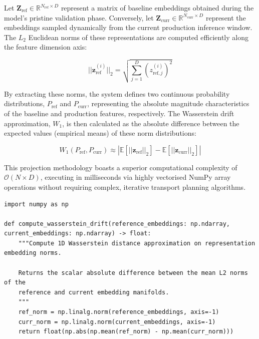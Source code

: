 Let $\mathbf{Z}_{\text{ref}} \in \mathbb{R}^{N_{\text{ref}} \times D}$ represent a matrix of baseline embeddings obtained during the model's pristine validation phase. Conversely, let $\mathbf{Z}_{\text{curr}} \in \mathbb{R}^{N_{\text{curr}} \times D}$ represent the embeddings sampled dynamically from the current production inference window. The $L_2$ Euclidean norms of these representations are computed efficiently along the feature dimension axis:

\begin{equation}
    ||\mathbf{z}_{\text{ref}}^{(i)}||_2 = \sqrt{\sum_{j=1}^{D} \left( z_{\text{ref}, j}^{(i)} \right)^2}
\end{equation}

By extracting these norms, the system defines two continuous probability distributions, $P_{\text{ref}}$ and $P_{\text{curr}}$, representing the absolute magnitude characteristics of the baseline and production features, respectively. The Wasserstein drift approximation, $W_1$, is then calculated as the absolute difference between the expected values (empirical means) of these norm distributions:

\begin{equation}
    W_1(P_{\text{ref}}, P_{\text{curr}}) \approx \left| \mathbb{E}[||\mathbf{z}_{\text{ref}}||_2] - \mathbb{E}[||\mathbf{z}_{\text{curr}}||_2] \right|
\end{equation}

This projection methodology boasts a superior computational complexity of $\mathcal{O}(N \times D)$, executing in milliseconds via highly vectorised NumPy array operations without requiring complex, iterative transport planning algorithms.

\begin{listing}[ht]
\caption{Vectorised computation of Wasserstein drift on continuous embedding norms.}
\label{lst:wasserstein_drift}
\begin{verbatim}
import numpy as np

def compute_wasserstein_drift(reference_embeddings: np.ndarray, current_embeddings: np.ndarray) -> float:
    """Compute 1D Wasserstein distance approximation on representation embedding norms.

    Returns the scalar absolute difference between the mean L2 norms of the
    reference and current embedding manifolds.
    """
    ref_norm = np.linalg.norm(reference_embeddings, axis=-1)
    curr_norm = np.linalg.norm(current_embeddings, axis=-1)
    return float(np.abs(np.mean(ref_norm) - np.mean(curr_norm)))
\end{verbatim}
\end{listing}

